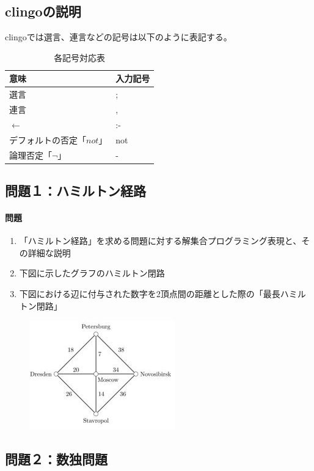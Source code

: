 \documentclass[dvipdfmx]{jsarticle}
\begin{document}
\subsection{clingoの説明}
clingoでは選言、連言などの記号は以下のように表記する。
\begin{table}[H]
  \centering
  \begin{tabular}{|l|l|} \hline
    意味 & 入力記号 \\ \hline
    選言              & ;   \\ \hline
    連言              & ,   \\ \hline
    $\leftarrow$    & :-  \\ \hline
    デフォルトの否定「$not$」 & not \\ \hline
    論理否定「$\neg$」    & - \\ \hline
    \end{tabular}
    \caption{各記号対応表}
\end{table}
\subsection{問題１：ハミルトン経路}
\paragraph{問題}
\begin{enumerate}
  \item 「ハミルトン経路」を求める問題に対する解集合プログラミング表現と、その詳細な説明
  \item 下図に示したグラフのハミルトン閉路
  \item 下図における辺に付与された数字を2頂点間の距離とした際の「最長ハミルトン閉路」
\end{enumerate}
\begin{figure}[H]
  \centering
  \includegraphics[scale=1.2]{images/hamiruton.JPG}
\end{figure}
\subsection{問題２：数独問題}
\end{document}
